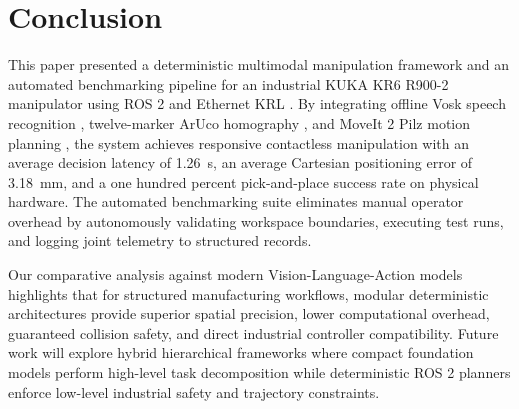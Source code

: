\documentclass{svproc}
\begin{document}
\FloatBarrier
\section{Conclusion}
\label{sec:conclusion}

This paper presented a deterministic multimodal manipulation framework and an automated benchmarking pipeline for an industrial KUKA KR6 R900-2 manipulator using ROS 2 \cite{ros2_2022} and Ethernet KRL \cite{kuka_eki2019}. By integrating offline Vosk speech recognition \cite{vosk2020}, twelve-marker ArUco homography \cite{aruco2014}, and MoveIt 2 \cite{moveit2014} Pilz motion planning \cite{pilz_motion2021}, the system achieves responsive contactless manipulation with an average decision latency of \SI{1.26}{\second}, an average Cartesian positioning error of \SI{3.18}{\milli\meter}, and a one hundred percent pick-and-place success rate on physical hardware. The automated benchmarking suite eliminates manual operator overhead by autonomously validating workspace boundaries, executing test runs, and logging joint telemetry to structured records.

Our comparative analysis against modern Vision-Language-Action models \cite{rt2_2023,openvla2024,octo2024} highlights that for structured manufacturing workflows, modular deterministic architectures provide superior spatial precision, lower computational overhead, guaranteed collision safety, and direct industrial controller compatibility. Future work will explore hybrid hierarchical frameworks where compact foundation models perform high-level task decomposition while deterministic ROS 2 planners enforce low-level industrial safety and trajectory constraints.
\end{document}
